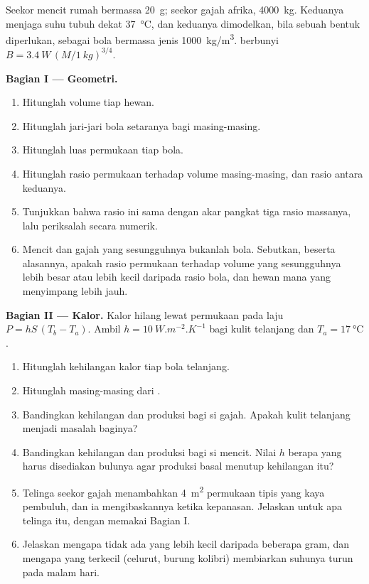 \begin{problem}
\label{pb:b1:organism-environment:1}
Seekor mencit rumah bermassa \qty{20}{g}; seekor gajah afrika,
\qty{4000}{kg}. Keduanya menjaga suhu tubuh dekat \qty{37}{\celsius},
dan keduanya dimodelkan, bila sebuah bentuk diperlukan, sebagai bola
bermassa jenis \qty{1000}{kg/m^3}.  berbunyi
$B = \qty{3.4}{W}\,(M/\qty{1}{kg})^{3/4}$.

\medskip
\noindent\textbf{Bagian I --- Geometri.}
\begin{enumerate}
  \item Hitunglah volume tiap hewan.
  \item Hitunglah jari-jari bola setaranya bagi masing-masing.
  \item Hitunglah luas permukaan tiap bola.
  \item Hitunglah rasio permukaan terhadap volume masing-masing, dan
        rasio antara keduanya.
  \item Tunjukkan bahwa rasio ini sama dengan akar pangkat tiga rasio
        massanya, lalu periksalah secara numerik.
  \item Mencit dan gajah yang sesungguhnya bukanlah bola. Sebutkan,
        beserta alasannya, apakah rasio permukaan terhadap volume yang
        sesungguhnya lebih besar atau lebih kecil daripada rasio bola,
        dan hewan mana yang menyimpang lebih jauh.
\end{enumerate}

\medskip
\noindent\textbf{Bagian II --- Kalor.}
Kalor hilang lewat permukaan pada laju $P = hS\,(T_b - T_a)$.
Ambil $h = \qty{10}{W.m^{-2}.K^{-1}}$ bagi kulit telanjang dan $T_a =
\qty{17}{\celsius}$.
\begin{enumerate}[resume]
  \item Hitunglah kehilangan kalor tiap bola telanjang.
  \item Hitunglah  masing-masing dari .
  \item Bandingkan kehilangan dan produksi bagi si gajah. Apakah kulit
        telanjang menjadi masalah baginya?
  \item Bandingkan kehilangan dan produksi bagi si mencit. Nilai $h$
        berapa yang harus disediakan bulunya agar produksi basal
        menutup kehilangan itu?
  \item Telinga seekor gajah menambahkan \qty{4}{m^2} permukaan tipis
        yang kaya pembuluh, dan ia mengibaskannya ketika kepanasan.
        Jelaskan untuk apa telinga itu, dengan memakai Bagian I.
  \item Jelaskan mengapa tidak ada  yang lebih kecil daripada
        beberapa gram, dan mengapa yang terkecil (celurut, burung
        kolibri) membiarkan suhunya turun pada malam hari.
\end{enumerate}


\end{problem}
